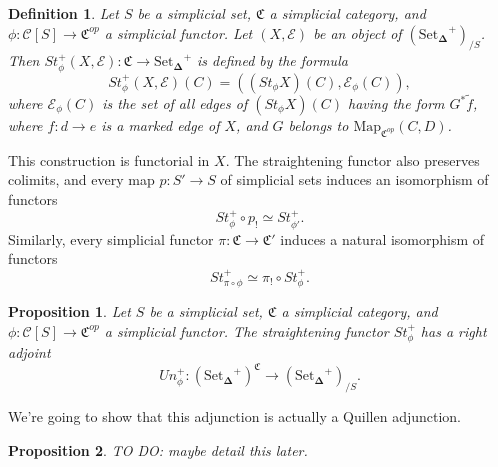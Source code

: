 \documentclass[12pt]{amsart}
\newcommand{\8}{\ensuremath{\infty}}
\newcommand{\C}{\ensuremath{\mathfrak{C}}}
\newcommand{\SSet}{\ensuremath{\text{Set}_{\boldsymbol{\Delta}}}}
\newcommand{\Map}{\ensuremath{\text{Map}}}
\newtheorem{definition}{Definition}
\newtheorem{proposition}{Proposition}
\begin{document}
{{\begin{definition}
  Let $S$ be a simplicial set, $\C$ a simplicial category, and $\phi:\mathscr{C}[S]\rightarrow \C^{op}$ a simplicial functor. Let $(X,\mathcal{E})$ be an object of $(\SSet^+)_{/S}$. Then $St_\phi^+(X,\mathcal{E}):\C\rightarrow \SSet^+$ is defined by the formula \[St_\phi^+(X,\mathcal{E})(C) = ((St_\phi X)(C),\mathcal{E}_\phi(C)),\] where $\mathcal{E}_\phi (C)$ is the set of all edges of $(St_\phi X)(C)$ having the form $G^*\tilde{f}$, where $f:d\rightarrow e$ is a marked edge of $X$, and $G$ belongs to $\Map_{\C^{op}}(C,D)$.
\end{definition}

This construction is functorial in $X$. The straightening functor also preserves colimits, and every map $p:S'\rightarrow S$ of simplicial sets induces an isomorphism of functors \[St_\phi^+\circ p_! \simeq St^+_{\phi'}.\] Similarly, every simplicial functor $\pi:\C\rightarrow \C'$ induces a natural isomorphism of functors \[St^+_{\pi\circ\phi} \simeq \pi_!\circ St^+_\phi.\]

\begin{proposition}
  Let $S$ be a simplicial set, $\C$ a simplicial category, and $\phi:\mathscr{C}[S]\rightarrow \C^{op}$ a simplicial functor. The straightening functor $St^+_\phi$ has a right adjoint \[Un_\phi^+:(\SSet^+)^\C\rightarrow (\SSet^+)_{/S}.\]
\end{proposition}

We're going to show that this adjunction is actually a Quillen adjunction.

\begin{proposition}
  TO DO: maybe detail this later.
\end{proposition}

}}
\end{document}
